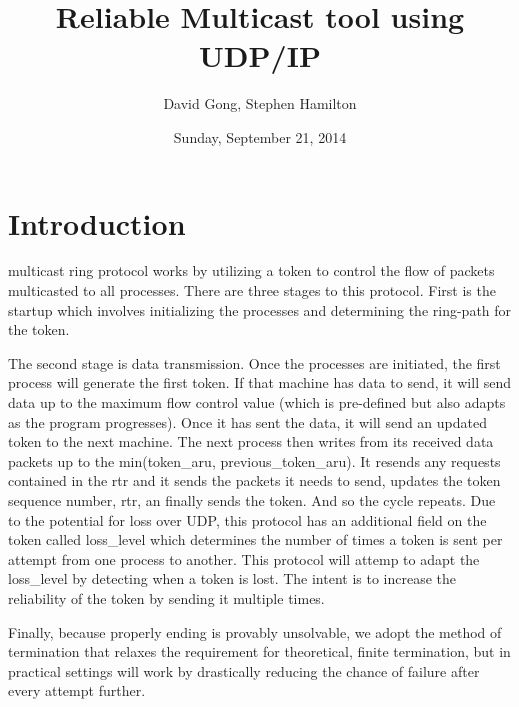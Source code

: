 \documentclass[12pt,journal,compsoc]{IEEEtran}
\begin{document}
\title{Reliable Multicast tool using UDP/IP}
\author{David Gong, Stephen Hamilton}%
\date{Sunday, September 21, 2014}
\maketitle
\section{Introduction}
 multicast ring protocol works by utilizing a token to control the flow of packets multicasted to all processes. There are three stages to this protocol. First is the startup which involves initializing the processes and determining the ring-path for the token.

The second stage is data transmission. Once the processes are initiated, the first process will generate the first token. If that machine has data to send, it will send data up to the maximum flow control value (which is pre-defined but also adapts as the program progresses). Once it has sent the data, it will send an updated token to the next machine. The next process then writes from its received data packets up to the min(token\_aru, previous\_token\_aru). It resends any requests contained in the rtr and it sends the packets it needs to send, updates the token sequence number, rtr, an finally sends the token. And so the cycle repeats. Due to the potential for loss over UDP, this protocol has an additional field on the token called loss\_level which determines the number of times a token is sent per attempt from one process to another. This protocol will attemp to adapt the loss\_level by detecting when a token is lost. The intent is to increase the reliability of the token by sending it multiple times.

Finally, because properly ending is provably unsolvable, we adopt the method of termination that relaxes the requirement for theoretical, finite termination, but in practical settings will work by drastically reducing the chance of failure after every attempt further.
\end{document}
